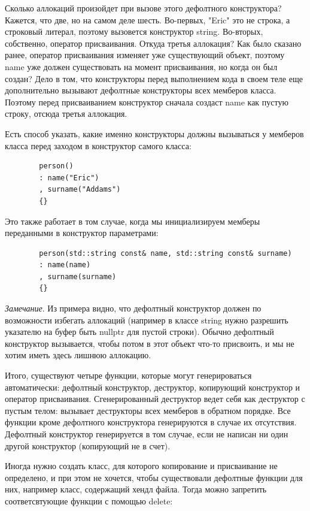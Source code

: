 \documentclass[12pt, a4paper]{article}
\begin{document}
	Сколько аллокаций произойдет при вызове этого дефолтного конструктора? Кажется, что две, но на самом деле шесть. Во-первых, "Eric" это не строка, а строковый литерал, поэтому вызовется конструктор string. Во-вторых, собственно, оператор присваивания. Откуда третья аллокация? Как было сказано ранее, оператор присваивания изменяет уже существующий объект, поэтому name уже должен существовать на момент присваивания, но когда он был создан? Дело в том, что конструкторы перед выполнением кода в своем теле еще дополнительно вызывают дефолтные конструкторы всех мемберов класса. Поэтому перед присваиванием конструктор сначала создаст name как пустую строку, отсюда третья аллокация.
	\\\par Есть способ указать, какие именно конструкторы должны вызываться у мемберов класса перед заходом в конструктор самого класса:
	\begin{verbatim}
		person() 
		: name("Eric")
		, surname("Addams")
		{}
	\end{verbatim}
	Это также работает в том случае, когда мы инициализируем мемберы переданными в конструктор параметрами:
	\begin{verbatim}
		person(std::string const& name, std::string const& surname) 
		: name(name)
		, surname(surname)
		{}
	\end{verbatim}
	\textit{Замечание}. Из примера видно, что дефолтный конструктор должен по возможности избегать аллокаций (например в классе string нужно разрешить указателю на буфер быть nullptr для пустой строки). Обычно дефолтный конструктор вызывается, чтобы потом в этот объект что-то присвоить, и мы не хотим иметь здесь лишнюю аллокацию.
	\\\par Итого, существуют четыре функции, которые могут генерироваться автоматически: дефолтный конструктор, деструктор, копирующий конструктор и оператор присваивания. Сгенерированный деструктор ведет себя как деструктор с пустым телом: вызывает деструкторы всех мемберов в обратном порядке. Все функции кроме дефолтного конструктора генерируются в случае их отсутствия. Дефолтный конструктор генерируется в том случае, если не написан ни один другой конструктор (копирующий не в счет).
	\\\par Иногда нужно создать класс, для которого копирование и присваивание не определено, и при этом не хочется, чтобы существовали дефолтные функции для них, например класс, содержащий хендл файла. Тогда можно запретить соответсвтующие функции с помощью delete:
\end{document}
